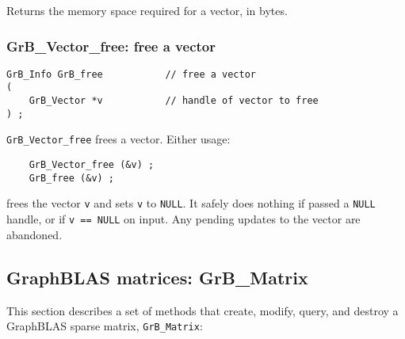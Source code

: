\documentclass[12pt]{article}
\begin{document}
{Returns the memory space required for a vector, in bytes.

\subsubsection{{\sf GrB\_Vector\_free:}          free a vector}
\label{vector_free}

\begin{mdframed}[userdefinedwidth=6in]
{\footnotesize
\begin{verbatim}
GrB_Info GrB_free           // free a vector
(
    GrB_Vector *v           // handle of vector to free
) ;
\end{verbatim}
} \end{mdframed}

\verb'GrB_Vector_free' frees a vector.  Either usage:

    {\small
    \begin{verbatim}
    GrB_Vector_free (&v) ;
    GrB_free (&v) ; \end{verbatim}}

\noindent
frees the vector \verb'v' and sets \verb'v' to \verb'NULL'.  It safely does
nothing if passed a \verb'NULL' handle, or if \verb'v == NULL' on input.  Any
pending updates to the vector are abandoned.

\newpage
\subsection{GraphBLAS matrices: {\sf GrB\_Matrix}} %
\label{matrix}

This section describes a set of methods that create, modify, query,
and destroy a GraphBLAS sparse matrix, \verb'GrB_Matrix':

}
\end{document}

